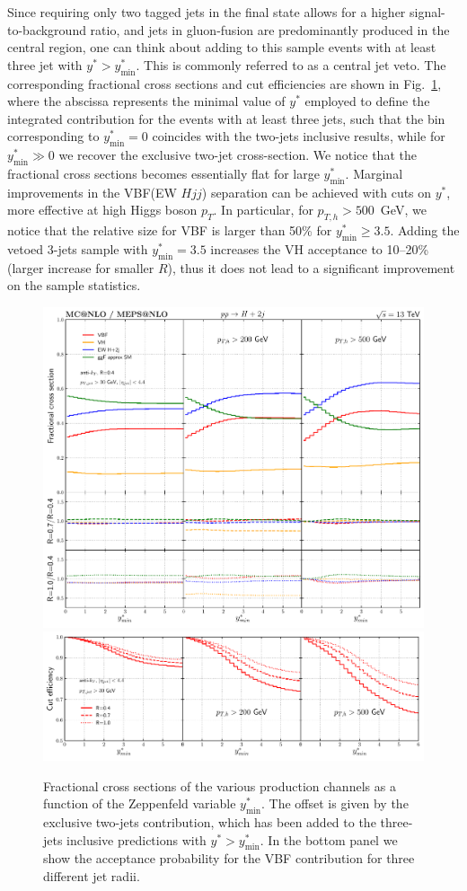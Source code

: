 \documentclass[10pt,prd,fleqn,superscriptaddress,notitlepage,nofootinbib,preprintnumbers,nobalancelastpage]{revtex4-1}
\newcommand{\VBF}{VBF\xspace}
\newcommand{\VH}{VH\xspace}
\begin{document}
Since requiring only two tagged jets in the final state allows for a higher signal-to-background ratio, and jets in gluon-fusion are predominantly produced in the central region, one can think about adding to this sample events with at least three jet with $y^*>y^*_{\min}$. This is commonly referred to as a central jet veto.
The corresponding fractional cross sections and cut efficiencies are shown in Fig.~\ref{fig:incl_y_star_fraction}, where the abscissa represents the minimal value of $y^*$ employed to define the integrated contribution for the events with at least three jets, such that the bin corresponding to $y^*_{\min}=0$ coincides with the two-jets inclusive results, while for $y^*_{\min}\gg0$ we recover the exclusive two-jet cross-section.
We notice that the fractional cross sections becomes essentially flat for large $y^*_{\min}$.
Marginal improvements in the \VBF (EW $Hjj$) separation can be achieved with cuts on $y^*$, more effective at high Higgs boson $p_T$. In particular, for $p_{T,h}>500$~GeV, we notice that the relative size for \VBF{} is larger than 50\% for $y_{\min}^*\ge 3.5$. Adding the vetoed 3-jets sample with $y_{\min}^*=3.5$ increases the \VH{} acceptance to 10--20\% (larger increase for smaller $R$), thus it does not lead to a significant improvement on the sample statistics.
\begin{figure}[t]
  \centering
  \includegraphics[width=.65\textwidth]{figures/vbf/y_star.pdf}
  \includegraphics[width=.65\textwidth]{figures/vbf/y_star_frac.pdf}
\caption{Fractional cross sections of the various production channels as a function of the Zeppenfeld variable $y^*_{\min}$.
The offset is given by the exclusive two-jets contribution, which has been added to the three-jets inclusive predictions with $y^*>y^*_{\min}$.
In the bottom panel we show the acceptance probability for the \VBF{} contribution for three different jet radii.}
\label{fig:incl_y_star_fraction}
\end{figure}
\end{document}
